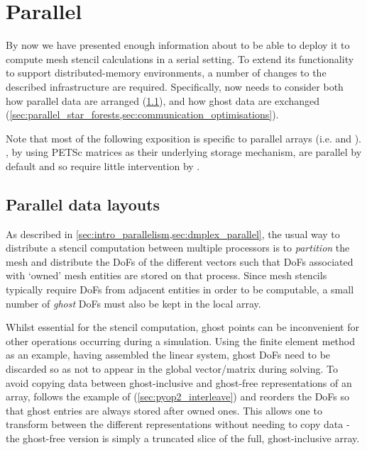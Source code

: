 \documentclass[thesis]{subfiles}
\begin{document}
\chapter{Parallel}
\label{chapter:parallel}

By now we have presented enough information about  to be able to deploy it to compute mesh stencil calculations in a serial setting.
To extend its functionality to support distributed-memory environments, a number of changes to the described infrastructure are required.
Specifically,  now needs to consider both how parallel data are arranged (\cref{sec:parallel_data_layouts}), and how ghost data are exchanged (\cref{sec:parallel_star_forests,sec:communication_optimisations}).

Note that most of the following exposition is specific to parallel arrays (i.e.  and ).
, by using PETSc matrices as their underlying storage mechanism, are parallel by default and so require little intervention by .

\section{Parallel data layouts}
\label{sec:parallel_data_layouts}

As described in \cref{sec:intro_parallelism,sec:dmplex_parallel}, the usual way to distribute a stencil computation between multiple processors is to \emph{partition} the mesh and distribute the DoFs of the different vectors such that DoFs associated with `owned' mesh entities are stored on that process.
Since mesh stencils typically require DoFs from adjacent entities in order to be computable, a small number of \emph{ghost} DoFs must also be kept in the local array.

Whilst essential for the stencil computation, ghost points can be inconvenient for other operations occurring during a simulation.
Using the finite element method as an example, having assembled the linear system, ghost DoFs need to be discarded so as not to appear in the global vector/matrix during solving.
To avoid copying data between ghost-inclusive and ghost-free representations of an array,  follows the example of  (\cref{sec:pyop2_interleave}) and reorders the DoFs so that ghost entries are always stored after owned ones.
This allows one to transform between the different representations without needing to copy data - the ghost-free version is simply a truncated slice of the full, ghost-inclusive array.
\end{document}
